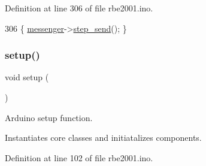 Definition at line 306 of file rbe2001.\+ino.


\begin{DoxyCode}
306 \{ \hyperlink{rbe2001_8ino_a48342badc24a04d2310ca16ff4a3711b}{messenger}->\hyperlink{class_messenger_a7e37226a7ee3e139fe22e05067e0013b}{step\_send}(); \}
\end{DoxyCode}
\mbox{\label{rbe2001_8ino_a4fc01d736fe50cf5b977f755b675f11d}} 
\subsubsection{\texorpdfstring{setup()}{setup()}}
{\footnotesize\ttfamily void setup (\begin{DoxyParamCaption}{ }\end{DoxyParamCaption})}



Arduino setup function. 

Instantiates core classes and initiatalizes components. 

Definition at line 102 of file rbe2001.\+ino.



